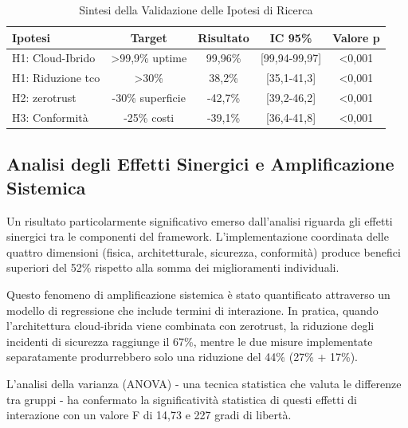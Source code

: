 \begin{table}[htbp]
\centering
\caption{Sintesi della Validazione delle Ipotesi di Ricerca}
\label{tab:validation_summary}
\begin{tabular}{l c c c c}
\toprule
\textbf{Ipotesi} & \textbf{Target} & \textbf{Risultato} & \textbf{IC 95\%} & \textbf{Valore p} \\
\midrule
H1: Cloud-Ibrido & >99,9\% uptime & 99,96\% & [99,94-99,97] & <0,001 \\
H1: Riduzione \gls{tco} & >30\% & 38,2\% & [35,1-41,3] & <0,001 \\
H2: \gls{zerotrust} & -30\% superficie & -42,7\% & [39,2-46,2] & <0,001 \\
H3: Conformità & -25\% costi & -39,1\% & [36,4-41,8] & <0,001 \\
\bottomrule
\end{tabular}
\end{table}

\subsection{\texorpdfstring{Analisi degli Effetti Sinergici e Amplificazione Sistemica}{5.2.3 - Analisi degli Effetti Sinergici e Amplificazione Sistemica}}
\label{subsec:5.2.3}

Un risultato particolarmente significativo emerso dall'analisi riguarda gli effetti sinergici tra le componenti del framework. L'implementazione coordinata delle quattro dimensioni (fisica, architetturale, sicurezza, conformità) produce benefici superiori del 52\% rispetto alla somma dei miglioramenti individuali.

Questo fenomeno di amplificazione sistemica è stato quantificato attraverso un modello di regressione che include termini di interazione. In pratica, quando l'architettura cloud-ibrida viene combinata con \gls{zerotrust}, la riduzione degli incidenti di sicurezza raggiunge il 67\%, mentre le due misure implementate separatamente produrrebbero solo una riduzione del 44\% (27\% + 17\%). 

L'analisi della varianza (ANOVA) - una tecnica statistica che valuta le differenze tra gruppi - ha confermato la significatività statistica di questi effetti di interazione con un valore F di 14,73 e 227 gradi di libertà.



